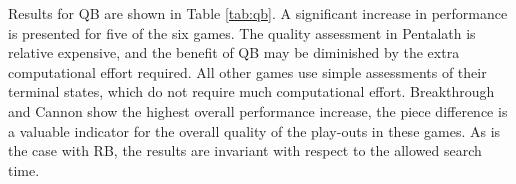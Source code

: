 \documentclass{ecai2014}
\begin{document}
\begin{table}
{\caption{Qualitative Bonus using different search times, 5000 games} \label{tab:qb}}
\tabcolsep=0.15cm
\centering
{}
\end{table}

Results for QB are shown in Table \ref{tab:qb}. A significant increase in performance is presented for five of the six games. The quality assessment in Pentalath is relative expensive, and the benefit of QB may be diminished by the extra computational effort required. All other games use simple assessments of their terminal states, which do not require much computational effort. Breakthrough and Cannon show the highest overall performance increase, the piece difference is a valuable indicator for the overall quality of the play-outs in these games. As is the case with RB, the results are invariant with respect to the allowed search time.
\end{document}
